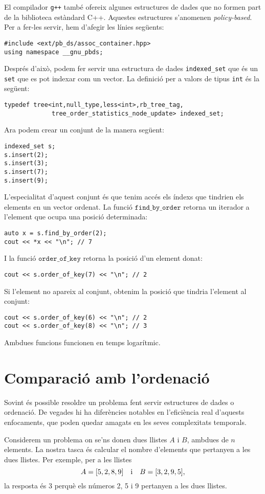El compilador \texttt{g++} també ofereix algunes
estructures de dades que no formen part
de la biblioteca estàndard C++.
Aquestes estructures s'anomenen \emph{policy-based}.
Per a fer-les servir, hem d'afegir les línies següents:
\begin{lstlisting}
#include <ext/pb_ds/assoc_container.hpp>
using namespace __gnu_pbds;
\end{lstlisting}
Després d'això, podem fer servir una estructura de dades
\texttt{indexed\_set} que
és un \texttt{set} que es pot indexar com un vector.
La definició per a valors de tipus \texttt{int} és la següent:
\begin{lstlisting}
typedef tree<int,null_type,less<int>,rb_tree_tag,
             tree_order_statistics_node_update> indexed_set; 
\end{lstlisting}
Ara podem crear un conjunt de la manera següent:
\begin{lstlisting}
indexed_set s;
s.insert(2);
s.insert(3);
s.insert(7);
s.insert(9);
\end{lstlisting}
L'especialitat d'aquest conjunt és que tenim accés
els índexs que tindrien els elements en un vector ordenat.
La funció $\texttt{find\_by\_order}$ retorna
un iterador a l'element que ocupa una posició determinada:
\begin{lstlisting}
auto x = s.find_by_order(2);
cout << *x << "\n"; // 7
\end{lstlisting}
I la funció $\texttt{order\_of\_key}$
retorna la posició d'un element donat:
\begin{lstlisting}
cout << s.order_of_key(7) << "\n"; // 2
\end{lstlisting}
Si l'element no apareix al conjunt,
obtenim la posició que tindria l'element
al conjunt:
\begin{lstlisting}
cout << s.order_of_key(6) << "\n"; // 2
cout << s.order_of_key(8) << "\n"; // 3
\end{lstlisting}
Ambdues funcions funcionen en temps logarítmic.

\section{Comparació amb l'ordenació}

Sovint és possible resoldre un problema
fent servir estructures de dades o ordenació.
De vegades hi ha diferències notables
en l'eficiència real d'aquests enfocaments,
que poden quedar amagats en les seves complexitats temporals.

Considerem un problema on
se'ns donen dues llistes $A$ i $B$, ambdues de
$n$ elements.
La nostra tasca és calcular el nombre d'elements
que pertanyen a les dues llistes.
Per exemple, per a les llistes
\[A = [5,2,8,9] \hspace{10px} \textrm{i} \hspace{10px} B = [3,2,9,5],\]
la resposta és 3 perquè els números 2, 5
i 9 pertanyen a les dues llistes.

